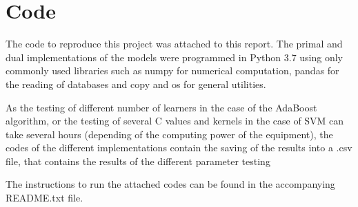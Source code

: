\documentclass[11pt,twocolumn,letterpaper]{article}
\begin{document}
\section{Code}

The code to reproduce this project was attached to this report. The primal and dual implementations of the models were programmed in Python 3.7 using only commonly used libraries such as numpy for numerical computation, pandas for the reading of databases and copy and os for general utilities.

As the  testing of different number of learners in the case of the AdaBoost algorithm, or the testing of several C values and kernels in the case of SVM can take several hours (depending of the computing power of the equipment), the codes of the different implementations contain the saving of the results into a .csv file, that contains the results of the different parameter testing

The instructions to run the attached codes can be found in the accompanying README.txt file.


{\small


}
\end{document}
